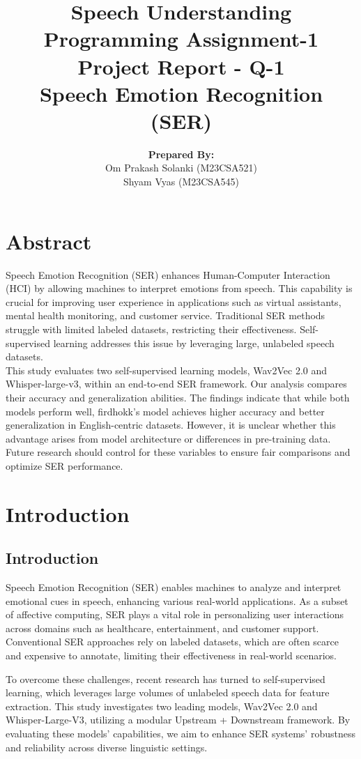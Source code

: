 \documentclass[a4paper,12pt]{article}
\title{\textbf{Speech Understanding}\\
\bigskip
\bigskip
\bigskip
{Programming Assignment-1}\\
\bigskip\bigskip\bigskip
{Project Report - Q-1} 
\bigskip\bigskip\bigskip\\
    {Speech Emotion Recognition (SER)}
}
\author{\textbf{Prepared By:}\\Om Prakash Solanki (M23CSA521)\\Shyam Vyas (M23CSA545)}
\begin{document}
\maketitle
\newpage
\section{Abstract}
Speech Emotion Recognition (SER) enhances Human-Computer Interaction (HCI) by allowing machines to interpret emotions from speech. This capability is crucial for improving user experience in applications such as virtual assistants, mental health monitoring, and customer service. Traditional SER methods struggle with limited labeled datasets, restricting their effectiveness. Self-supervised learning addresses this issue by leveraging large, unlabeled speech datasets.\\
This study evaluates two self-supervised learning models, Wav2Vec 2.0 and Whisper-large-v3, within an end-to-end SER framework. Our analysis compares their accuracy and generalization abilities. The findings indicate that while both models perform well, firdhokk’s model achieves higher accuracy and better generalization in English-centric datasets. However, it is unclear whether this advantage arises from model architecture or differences in pre-training data. Future research should control for these variables to ensure fair comparisons and optimize SER performance.
\newpage
\tableofcontents
\newpage

\section{Introduction}
\subsection{Introduction}
Speech Emotion Recognition (SER) enables machines to analyze and interpret emotional cues in speech, enhancing various real-world applications. As a subset of affective computing, SER plays a vital role in personalizing user interactions across domains such as healthcare, entertainment, and customer support. Conventional SER approaches rely on labeled datasets, which are often scarce and expensive to annotate, limiting their effectiveness in real-world scenarios.

To overcome these challenges, recent research has turned to self-supervised learning, which leverages large volumes of unlabeled speech data for feature extraction. This study investigates two leading models, Wav2Vec 2.0 and Whisper-Large-V3, utilizing a modular Upstream + Downstream framework. By evaluating these models’ capabilities, we aim to enhance SER systems' robustness and reliability across diverse linguistic settings.
\end{document}
